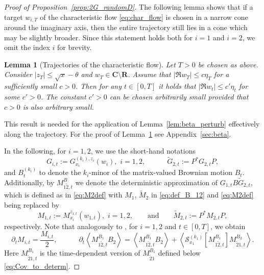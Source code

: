 \documentclass[10pt]{amsart}
\newtheorem{lemma}[theorem]{Lemma}
\numberwithin{equation}{section}
\newcommand{\R}{\mathbf{R}}
\newcommand{\C}{\mathbf{C}}
\begin{document}
\begin{proof}[Proof of Proposition~\ref{prop:2G_randomD}]
The following lemma shows that if a target $w_{i,T}$ of the characteristic flow \eqref{eq:char_flow} is chosen in a narrow cone around the imaginary axis, then the entire trajectory still lies in a cone which may be slightly broader.  Since this statement holds both for $i=1$ and $i=2$, we omit the index $i$ for brevity.

\begin{lemma}[Trajectories of the characteristic flow]\label{lem:trajectories} Let $T>0$ be chosen as above. Consider $|z_T|\le \sqrt{x}-\theta$ and $w_T\in\C\setminus\R$. Assume that $|\Re w_T|\le c\eta_T$ for a sufficiently small $c>0$.  Then for any $t\in [0,T]$ it holds that $|\Re w_t|\le c'\eta_t$ for some $c'>0$. The constant $c'>0$ can be chosen arbitrarily small provided that $c>0$ is also arbitrary small.
\end{lemma}

This result is needed for the application of Lemma~\ref{lem:beta_perturb} effectively along the trajectory. For the proof of Lemma~\ref{lem:trajectories} see Appendix~\ref{sec:beta}.


In the following, for $i=1,2$, we use the short-hand notations
\begin{equation}
G_{i,t}:=G_{x_i}^{(k_i),z_i}(w_i),\,\, i=1,2,\qquad\quad \widetilde{G}_{2,t}:=P^*G_{2,t}P,
\end{equation}
and $B_t^{(k_i)}$ to denote the $k_i$-minor of the matrix-valued Brownian motion $B_t$. Additionally, by $M_{1\widetilde{2},t}^B$ we denote the deterministic approximation of $G_{1,t}B\widetilde{G}_{2,t}$, which is defined as in \eqref{eq:M2def} with $M_1$, $\widetilde{M}_2$ in \eqref{eq:def_B_12} and \eqref{eq:M2def} being replaced by
\[
M_{1,t}:=M^{z_{1,t}}_{x_i}(w_{1,t}),\,\,i=1,2, \qquad\text{and}\qquad \widetilde{M}_{2,t}:=P^*M_{2,t}P,
\]
respectively. Note that analogously to \cite[Eq.(A.19),(A.26)]{Cipolloni_meso}, for $i=1,2$ and $t\in[0,T]$, we obtain
\begin{equation}
\label{eq:M2derivative}
\partial_t M_{i,t}=\frac{M_{i,t}}{2}, \qquad\quad \partial_t \left\langle M_{1\widetilde{2},t}^{B_1}B_2\right\rangle =\left\langle M_{1\widetilde{2},t}^{B_1}B_2\right\rangle+\left\langle \mathcal{S}^{(k_1)}_{x_1}\left[M_{1\widetilde{2},t}^{B_1}\right] M_{\widetilde{2}1,t}^{B_2}\right\rangle.
\end{equation}
Here $M_{\widetilde{2}1,t}^{B_1}$ is the time-dependent version of $M_{\widetilde{2}1}^{B_1}$ defined below \eqref{eq:Cov_to_determ}.


\end{proof}
\end{document}
